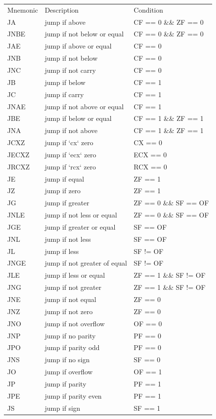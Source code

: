 \documentclass[a4paper,oneside,onecolumn,12pt]{LegrandOrangeBook}
\begin{document}
\begin{center}
    \begin{tabular}{|l|l|l|}
        Mnemonic & Description & Condition \\
        JA & jump if above & CF == 0 \&\& ZF == 0 \\
        JNBE & jump if not below or equal & CF == 0 \&\& ZF == 0 \\
        JAE & jump if above or equal & CF == 0 \\
        JNB & jump if not below & CF == 0 \\
        JNC & jump if not carry & CF == 0 \\
        JB & jump if below & CF == 1 \\
        JC & jump if carry & CF == 1 \\
        JNAE & jump if not above or equal & CF == 1 \\
        JBE & jump if below or equal & CF == 1 \&\& ZF == 1 \\
        JNA & jump if not above & CF == 1 \&\& ZF == 1 \\
        JCXZ & jump if `cx` zero & CX == 0 \\
        JECXZ & jump if `ecx` zero & ECX == 0 \\
        JRCXZ & jump if `rcx` zero & RCX == 0 \\
        JE & jump if equal & ZF == 1 \\
        JZ &  jump if zero & ZF == 1 \\
        JG & jump if greater & ZF == 0 \&\& SF == OF \\
        JNLE & jump if not less or equal & ZF == 0 \&\& SF == OF \\
        JGE & jump if greater or equal & SF == OF \\
        JNL & jump if not less & SF == OF \\
        JL & jump if less & SF != OF \\
        JNGE & jump if not greater of equal & SF != OF \\
        JLE & jump if less or equal & ZF == 1 \&\& SF != OF \\
        JNG & jump if not greater & ZF == 1 \&\& SF != OF \\
        JNE & jump if not equal & ZF == 0 \\
        JNZ & jump if not zero & ZF == 0 \\
        JNO & jump if not overflow & OF == 0 \\
        JNP & jump if no parity & PF == 0 \\
        JPO & jump if parity odd & PF == 0 \\
        JNS & jump if no sign & SF == 0 \\
        JO & jump if overflow & OF == 1 \\
        JP & jump if parity & PF == 1 \\
        JPE & jump if parity even & PF == 1 \\
        JS & jump if sign & SF == 1 \\
    \end{tabular}
\end{center}
\end{document}
